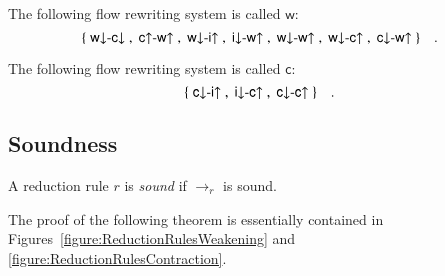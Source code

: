 \newcommand{\frw}{{\mathsf w}}
\begin{definition}\label{definition:FlowRewritingWeakening}
The following flow rewriting system is called $\frw$:
\[
\{\;\rwdcd\;,\;\rcuwu\;,\;\rwdiu\;,\;\ridwu\;,\;\rwdwu\;,\;\rwdcu\;,\;\rcdwu\;\}
\quad.
\]
\end{definition}

\newcommand{\frc}{{\mathsf c}}
\begin{definition}\label{definition:FlowRewritingContraction}
The following flow rewriting system is called $\frc$:
\[
\{\;\rcdiu\;,\;\ridcu\;,\;\rcdcu\;\}\quad.
\]
\end{definition}

\subsection{Soundness}\label{subsection:soundness}

\begin{definition}\label{definition:SoundRedcutionRule}
A reduction rule $r$ is \emph{sound} if $\to_r$ is sound.
\end{definition}

The proof of the following theorem is essentially contained in Figures~\vref{figure:ReductionRulesWeakening} and \vref{figure:ReductionRulesContraction}.

